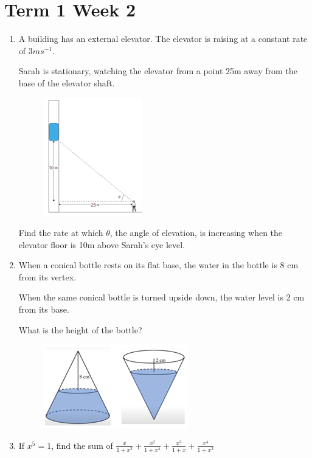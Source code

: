 \documentclass[../main.tex]{subfiles}
\begin{document}
\section*{Term 1 Week 2}
\begin{enumerate}
    \item 
    A building has an external elevator. The elevator is raising at a constant rate of \(3 ms^{-1} \).

    Sarah is stationary, watching the elevator from a point 25m away from the base of the elevator shaft.

    \begin{figure}[h]
        \centering
        \includegraphics{../images/t1w1q1.png}
    \end{figure}
    
    Find the rate at which \(\theta\), the angle of elevation, is increasing when the elevator floor is 10m above Sarah’s eye level.

    \item 
    When a conical bottle rests on its flat base, the water in the bottle is 8 cm from its vertex.

    When the same conical bottle is turned upside down, the water level is 2 cm from its base.

    What is the height of the bottle?
    \begin{figure}[h]
        \centering
        \includegraphics{../images/t1w1q2.png}
    \end{figure}
    
    \item 
    If \(x^5=1\), find the sum of \(\frac{x}{1+x^2}+\frac{x^2}{1+x^4}+\frac{x^3}{1+x}+\frac{x^4}{1+x^3}\)
\end{enumerate}
\end{document}
